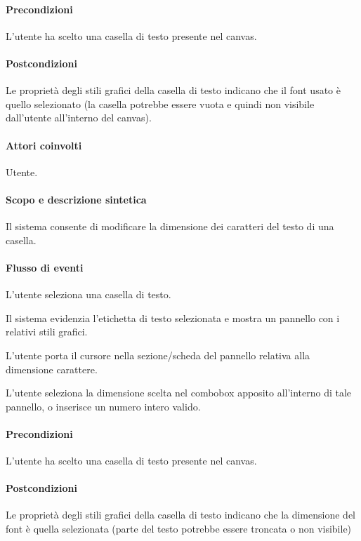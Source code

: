 \paragraph{Precondizioni} L'utente ha scelto una casella di testo presente nel canvas.
\paragraph{Postcondizioni} Le propriet\` a degli stili grafici della casella di testo indicano che il font usato \` e quello selezionato (la casella potrebbe essere vuota e quindi non visibile dall'utente all'interno del canvas).

\paragraph{Attori coinvolti} Utente.
\paragraph{Scopo e descrizione sintetica} 
Il sistema consente di modificare la dimensione dei caratteri del testo di una casella.
\paragraph{Flusso di eventi}
\begin{elenconumerato}[\textbf{}]{\subsubsecindent}
\item L'utente seleziona una casella di testo.
\item Il sistema evidenzia l'etichetta di testo selezionata e mostra un pannello con i relativi stili grafici.
\item L'utente porta il cursore nella sezione/scheda del pannello relativa alla dimensione carattere.
\item L'utente seleziona la dimensione scelta nel combobox apposito all'interno di tale pannello, o inserisce un numero intero valido.
\end{elenconumerato}
\paragraph{Precondizioni}L'utente ha scelto una casella di testo presente nel canvas.
\paragraph{Postcondizioni}Le propriet\`a degli stili grafici della casella di testo indicano che la dimensione del font \` e quella selezionata (parte del testo potrebbe essere troncata o non visibile)

